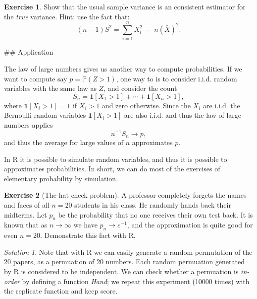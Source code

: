 \documentclass[
]{article}
\theoremstyle{definition}
\theoremstyle{definition}
\theoremstyle{definition}
\newtheorem{exercise}{Exercise}[section]
\theoremstyle{remark}
\newtheorem*{solution}{Solution}
\begin{document}
\begin{exercise}
\protect\hypertarget{exr:unnamed-chunk-8}{}{\label{exr:unnamed-chunk-8} }Show that the usual sample variance is an consistent estimator for the \emph{true} variance.
Hint: use the fact that:
\[(n-1)S^2 = \sum_{i=1}^n X_i^2 \ - \ n(\bar{X})^2.\]
\end{exercise}
\#\# Application

The law of large numbers gives us another way to compute probabilities. If we want to compute say \(p=\mathbb{P}( Z> 1)\), one way to is to consider i.i.d. random variables with the same law as \(Z\), and consider the count
\[ S_n = \mathbf{1}[X_1 >1] + \cdots + \mathbf{1}[X_n >1],\]
where \(\mathbf{1}[X_i >1] =1\) if \(X_i >1\) and zero otherwise. Since the \(X_i\) are i.i.d. the Bernoulli random variables \(\mathbf{1}[X_i >1]\) are also i.i.d. and thus the law of large numbers applies\\
\[ n^{-1} S_n \to p,\]
and thus the average for large values of \(n\) approximates \(p\).

In R it is possible to simulate random variables, and thus it is possible to approximates probabilities. In short, we can do most of the exercises of elementary probability by simulation.

\begin{exercise}[The hat check problem]
\protect\hypertarget{exr:unnamed-chunk-9}{}{\label{exr:unnamed-chunk-9} \iffalse (The hat check problem) \fi{} }A professor completely forgets the names and faces of all \(n=20\) students in his class. He randomly hands back their midterms. Let \(p_n\) be the probability that no one receives their own test back. It is known that as \(n \to \infty\) we have \(p_n \to e^{-1}\), and the approximation is quite good for even \(n=20\). Demonstrate this fact with R.\\
\end{exercise}
\begin{solution}
\iffalse{} {Solution. } \fi{}
Note that with R we can easily generate a random permutation of the 20 papers, as a permuation of 20 numbers. Each random permuation generated by R is considered to be independent. We can check whether a permuation is \emph{in-order} by defining a function \emph{Hand}; we repeat this experiment (10000 times) with the replicate function and keep score.
\end{solution}
\end{document}
